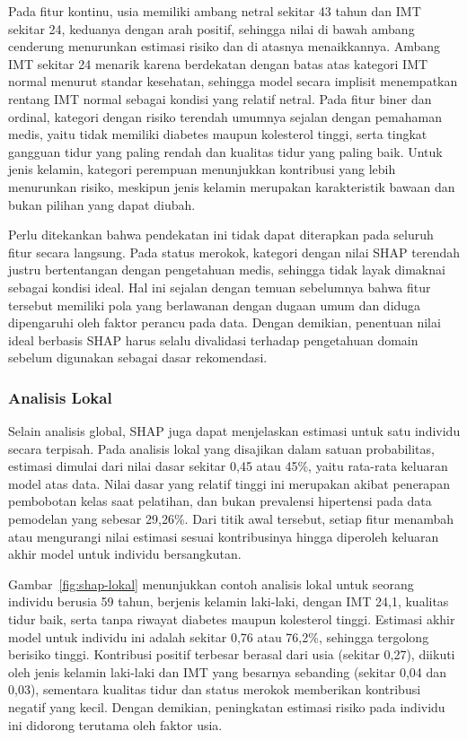 Pada fitur kontinu, usia memiliki ambang netral sekitar 43 tahun dan IMT sekitar 24, keduanya dengan arah positif, sehingga nilai di bawah ambang cenderung menurunkan estimasi risiko dan di atasnya menaikkannya. Ambang IMT sekitar 24 menarik karena berdekatan dengan batas atas kategori IMT normal menurut standar kesehatan, sehingga model secara implisit menempatkan rentang IMT normal sebagai kondisi yang relatif netral. Pada fitur biner dan ordinal, kategori dengan risiko terendah umumnya sejalan dengan pemahaman medis, yaitu tidak memiliki diabetes maupun kolesterol tinggi, serta tingkat gangguan tidur yang paling rendah dan kualitas tidur yang paling baik. Untuk jenis kelamin, kategori perempuan menunjukkan kontribusi yang lebih menurunkan risiko, meskipun jenis kelamin merupakan karakteristik bawaan dan bukan pilihan yang dapat diubah.

Perlu ditekankan bahwa pendekatan ini tidak dapat diterapkan pada seluruh fitur secara langsung. Pada status merokok, kategori dengan nilai SHAP terendah justru bertentangan dengan pengetahuan medis, sehingga tidak layak dimaknai sebagai kondisi ideal. Hal ini sejalan dengan temuan sebelumnya bahwa fitur tersebut memiliki pola yang berlawanan dengan dugaan umum dan diduga dipengaruhi oleh faktor perancu pada data. Dengan demikian, penentuan nilai ideal berbasis SHAP harus selalu divalidasi terhadap pengetahuan domain sebelum digunakan sebagai dasar rekomendasi.

\subsubsection{Analisis Lokal}

Selain analisis global, SHAP juga dapat menjelaskan estimasi untuk satu individu secara terpisah. Pada analisis lokal yang disajikan dalam satuan probabilitas, estimasi dimulai dari nilai dasar sekitar 0,45 atau 45\%, yaitu rata-rata keluaran model atas data. Nilai dasar yang relatif tinggi ini merupakan akibat penerapan pembobotan kelas saat pelatihan, dan bukan prevalensi hipertensi pada data pemodelan yang sebesar 29,26\%. Dari titik awal tersebut, setiap fitur menambah atau mengurangi nilai estimasi sesuai kontribusinya hingga diperoleh keluaran akhir model untuk individu bersangkutan.

Gambar~\ref{fig:shap-lokal} menunjukkan contoh analisis lokal untuk seorang individu berusia 59 tahun, berjenis kelamin laki-laki, dengan IMT 24,1, kualitas tidur baik, serta tanpa riwayat diabetes maupun kolesterol tinggi. Estimasi akhir model untuk individu ini adalah sekitar 0,76 atau 76,2\%, sehingga tergolong berisiko tinggi. Kontribusi positif terbesar berasal dari usia (sekitar 0,27), diikuti oleh jenis kelamin laki-laki dan IMT yang besarnya sebanding (sekitar 0,04 dan 0,03), sementara kualitas tidur dan status merokok memberikan kontribusi negatif yang kecil. Dengan demikian, peningkatan estimasi risiko pada individu ini didorong terutama oleh faktor usia.

